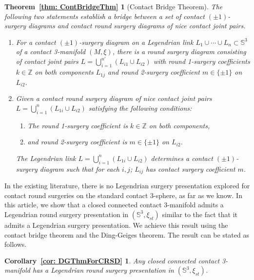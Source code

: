 \documentclass{amsart}
\theoremstyle{plain}
\newtheorem*{thmintro3}{Theorem~\ref{thm: ContBridgeThm}}
\newtheorem*{corintro}{Corollary~\ref{cor: DGThmForCRSD}}
\theoremstyle{remark}
\theoremstyle{definition}
\newcommand{\s}{\mathbb{S}}
\begin{document}
\begin{thmintro3}[Contact Bridge Theorem]
The following two statements establish a bridge between a set of contact $(\pm1)$-surgery diagrams and contact round surgery diagrams of nice contact joint pairs. 
\begin{enumerate}
    \item [(1)] For a contact $(\pm1)$-surgery diagram on a Legendrian link $L_1 \cup \cdots \cup L_n \subset \s^3$ of a contact 3-manifold $(M, \xi)$, there is a round surgery diagram consisting of contact joint pairs $L= \bigcup_{i=1}^{n'} (L_{i1}\cup L_{i2})$ with round 1-surgery coefficients $k\in \mathbb{Z} $ on both components $L_{1j}$ and round 2-surgery coefficient $m \in \{\pm1\}$ on $L_{i2}$. 
    \item [(2)]Given a contact round surgery diagram of nice contact joint pairs $L= \bigcup_{i=1}^{n} (L_{1i}\cup L_{i2})$ satisfying the following conditions: 
    \begin{enumerate}
        \item The round 1-surgery coefficient is $k \in  \mathbb{Z}$ on both components, 
        \item and round 2-surgery coefficient is $m\in \{\pm1\}$ on $L_{i2}$. 
    \end{enumerate}
    The Legendrian link $L= \bigcup_{i=1}^{n} (L_{1i}\cup L_{i2})$ determines a contact $(\pm1)$-surgery diagram such that for each $i,j$; $L_{ij}$ has contact surgery coefficient $m$. 
\end{enumerate}
    
\end{thmintro3}


In the existing literature, there is no Legendrian surgery presentation explored for contact round surgeries on the standard contact 3-sphere, as far as we know. 
In this article, we show that a closed connected contact 3-manifold admits a Legendrian round surgery presentation in $\left(\s^3, \xi_{st}\right)$ similar to the fact that it admits a Legendrian surgery presentation.  
We achieve this result using the contact bridge theorem and the Ding-Geiges theorem. The result can be stated as follows. 
\begin{corintro}
    Any closed connected contact 3-manifold has a Legendrian round surgery presentation in $\left(\s^3, \xi_{st}\right)$. 
\end{corintro}
   
\end{document}
